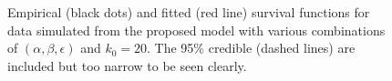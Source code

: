 \documentclass[
  sn-basic,
  10pt,
]{sn-jnl}
\theoremstyle{thmstyleone}
\theoremstyle{thmstyleone}
\theoremstyle{remark}
\theoremstyle{plain}
\theoremstyle{plain}
\theoremstyle{remark}
\begin{document}
\begin{figure}


\caption{\label{fig-rec1}Empirical (black dots) and fitted (red line)
survival functions for data simulated from the proposed model with
various combinations of \((\alpha,\beta,\epsilon)\) and \(k_0=20\). The
95\% credible (dashed lines) are included but too narrow to be seen
clearly.}

\end{figure}%
\end{document}
